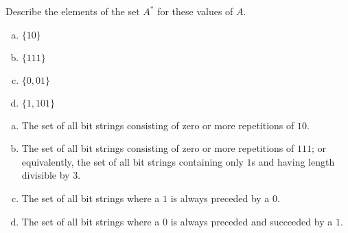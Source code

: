 \documentclass[../main.tex]{subfiles}
\begin{document}
Describe the elements of the set $A^\ast$ for these values of $A$.
\begin{enumerate}[a)]
	\item $\{10\}$
	\item $\{111\}$
	\item $\{0, 01\}$
	\item $\{1, 101\}$
\end{enumerate}

\solution
\begin{enumerate}[a)]
	\item The set of all bit strings consisting of zero or more repetitions of $10$.
	\item The set of all bit strings consisting of zero or more repetitions of $111$; or equivalently, the set of all bit strings containing only $1$s and having length divisible by $3$.
	\item The set of all bit strings where a $1$ is always preceded by a $0$.
	\item The set of all bit strings where a $0$ is always preceded and succeeded by a $1$.
\end{enumerate}
\end{document}
